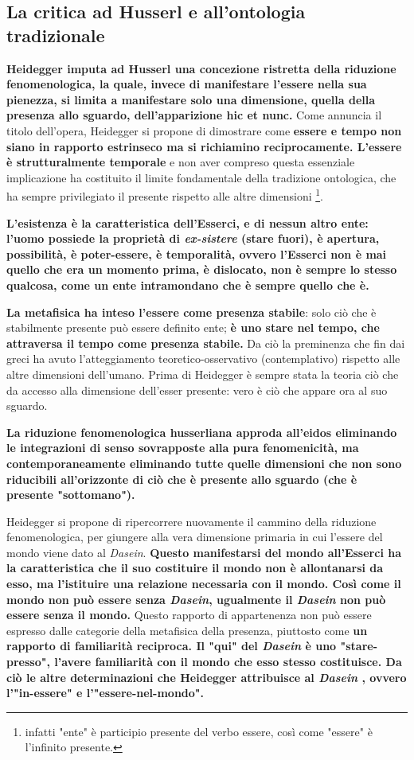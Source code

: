 \subsection{La critica ad Husserl e all'ontologia tradizionale}

\textbf{Heidegger imputa ad Husserl una concezione
ristretta della riduzione fenomenologica, la quale,
invece di manifestare l'essere nella sua pienezza,
si limita a manifestare solo una dimensione,
quella della presenza allo sguardo, dell'apparizione hic et nunc.}
Come annuncia il titolo dell'opera, Heidegger
si propone di dimostrare come \textbf{essere e tempo
non siano in rapporto estrinseco ma si richiamino
reciprocamente. L'essere è strutturalmente
temporale }e non aver compreso questa essenziale
implicazione ha costituito il limite fondamentale
della tradizione ontologica, che ha sempre
privilegiato il presente rispetto alle altre dimensioni
\footnote{infatti "ente" è participio presente del verbo essere, così
	come "essere" è l'infinito presente.}.

\textbf{L'esistenza è la caratteristica dell'Esserci, e di nessun altro ente: l'uomo possiede la proprietà di \textit{ex-sistere} (stare fuori), è apertura, possibilità, è poter-essere, è temporalità, ovvero l'Esserci non è mai quello che era un momento prima, è dislocato, non è sempre lo stesso qualcosa, come un ente intramondano che è sempre quello che è.}

\textbf{La metafisica ha inteso l'essere come presenza
stabile}: solo ciò che è stabilmente presente può
essere definito ente; \textbf{è uno stare nel tempo, che
attraversa il tempo come presenza stabile.}
Da ciò la preminenza che fin dai greci ha avuto
l'atteggiamento teoretico-osservativo (contemplativo) rispetto alle
altre dimensioni dell'umano. Prima di Heidegger è sempre stata la teoria ciò che
da accesso alla dimensione dell'esser presente: vero è
ciò che appare ora al suo sguardo.


\textbf{La riduzione fenomenologica husserliana approda
all'eidos eliminando le integrazioni di senso
sovrapposte alla pura fenomenicità, ma contemporaneamente eliminando tutte quelle dimensioni che non
sono riducibili all'orizzonte di ciò che è presente
allo sguardo (che è presente "sottomano").}

Heidegger si propone di ripercorrere nuovamente
il cammino della riduzione fenomenologica,
per giungere alla vera dimensione primaria in cui
l'essere del mondo viene dato al \textit{Dasein}.
\textbf{Questo manifestarsi del mondo all'Esserci ha
la caratteristica che
il suo costituire il mondo non è allontanarsi
da esso, ma l'istituire una relazione necessaria
con il mondo. Così come il mondo non può essere
senza \textit{Dasein}, ugualmente il \textit{Dasein} non può essere
senza il mondo.} Questo rapporto di appartenenza
non può essere espresso dalle categorie della metafisica
della presenza, piuttosto come \textbf{un rapporto di familiarità
reciproca. Il "qui" del \textit{Dasein} è uno "stare-presso",
l'avere familiarità con il mondo che esso stesso
costituisce.
Da ciò le altre determinazioni che Heidegger
attribuisce al \textit{Dasein} , ovvero l'"in-essere" e
l'"essere-nel-mondo".}

